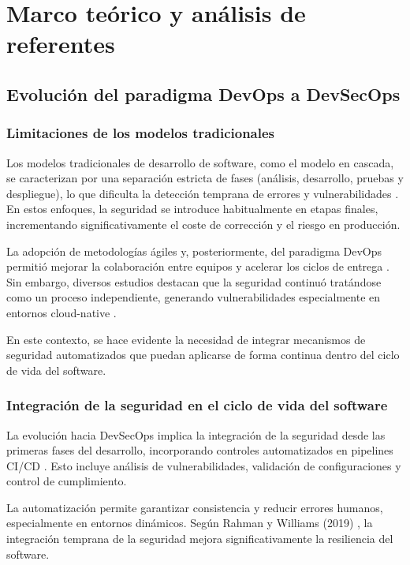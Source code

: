 \chapter{Marco teórico y análisis de referentes}

\section{Evolución del paradigma DevOps a DevSecOps}

\subsection{Limitaciones de los modelos tradicionales}

Los modelos tradicionales de desarrollo de software, como el modelo en cascada, se caracterizan por una separación estricta de fases (análisis, desarrollo, pruebas y despliegue), lo que dificulta la detección temprana de errores y vulnerabilidades \cite{pressman2019software}. En estos enfoques, la seguridad se introduce habitualmente en etapas finales, incrementando significativamente el coste de corrección y el riesgo en producción.

La adopción de metodologías ágiles y, posteriormente, del paradigma DevOps permitió mejorar la colaboración entre equipos y acelerar los ciclos de entrega \cite{kim2016devops}. Sin embargo, diversos estudios destacan que la seguridad continuó tratándose como un proceso independiente, generando vulnerabilidades especialmente en entornos cloud-native \cite{sharma2020devsecops}.

En este contexto, se hace evidente la necesidad de integrar mecanismos de seguridad automatizados que puedan aplicarse de forma continua dentro del ciclo de vida del software.

\subsection{Integración de la seguridad en el ciclo de vida del software}

La evolución hacia DevSecOps implica la integración de la seguridad desde las primeras fases del desarrollo, incorporando controles automatizados en pipelines CI/CD \cite{behl2017devsecops}. Esto incluye análisis de vulnerabilidades, validación de configuraciones y control de cumplimiento.

La automatización permite garantizar consistencia y reducir errores humanos, especialmente en entornos dinámicos. Según Rahman y Williams (2019) \cite{rahman2019devsecops}, la integración temprana de la seguridad mejora significativamente la resiliencia del software.

